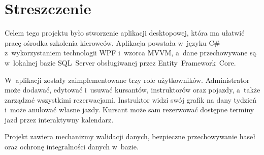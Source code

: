 \chapter*{Streszczenie}
\thispagestyle{plain}

Celem tego projektu by\l{}o stworzenie aplikacji desktopowej, kt\'{o}ra ma u\l{}atwi\'{c}
prac\k{e} o\'{s}rodka szkolenia kierowc\'{o}w. Aplikacja powsta\l{}a w~j\k{e}zyku C\#
z~wykorzystaniem technologii WPF i~wzorca MVVM, a~dane przechowywane s\k{a} w~lokalnej
bazie SQL~Server obs\l{}ugiwanej przez Entity~Framework~Core.

W~aplikacji zosta\l{}y zaimplementowane trzy role u\.{z}ytkownik\'{o}w. Administrator
mo\.{z}e dodawa\'{c}, edytowa\'{c} i~usuwa\'{c} kursant\'{o}w, instruktor\'{o}w oraz
pojazdy, a~tak\.{z}e zarz\k{a}dza\'{c} wszystkimi rezerwacjami. Instruktor widzi sw\'{o}j
grafik na dany tydzie\'{n} i~mo\.{z}e anulowa\'{c} w\l{}asne jazdy. Kursant mo\.{z}e sam
rezerwowa\'{c} dost\k{e}pne terminy jazd przez interaktywny kalendarz.

Projekt zawiera mechanizmy walidacji danych, bezpieczne przechowywanie hase\l{}
oraz ochron\k{e} integralno\'{s}ci danych w~bazie.
